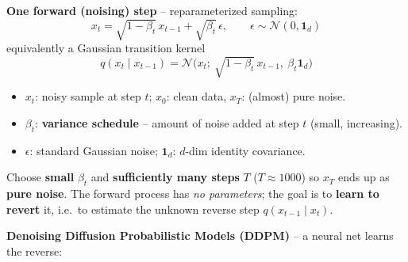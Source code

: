 \documentclass[10pt,a4paper]{article}
\begin{document}
	\begin{formulabox}
		\textbf{One forward (noising) step} -- reparameterized sampling:
		\[
			x_t = \sqrt{1-\beta_t}\,x_{t-1} + \sqrt{\beta_t}\,\epsilon,
			\qquad \epsilon \sim \mathcal{N}(0,\mathbf{1}_d)
		\]
		equivalently a Gaussian transition kernel
		\[
			q(x_t\mid x_{t-1}) = \mathcal{N}\!\big(x_t;\ \sqrt{1-\beta_t}\,x_{t-1},\ \beta_t\mathbf{1}_d\big)
		\]
	\end{formulabox}
	\begin{itemize}[leftmargin=*]
		\item $x_t$: noisy sample at step $t$; \quad $x_0$: clean data, $x_T$: (almost) pure noise.
		\item $\beta_t$: \textbf{variance schedule} -- amount of noise added at step $t$ (small, increasing).
		\item $\epsilon$: standard Gaussian noise; $\mathbf{1}_d$: $d$-dim identity covariance.
	\end{itemize}

	\begin{importantbox}
		Choose \textbf{small} $\beta_t$ and \textbf{sufficiently many steps} $T$ ($T\approx 1000$) so $x_T$ ends up as \textbf{pure noise}. The forward process has \emph{no parameters}; the goal is to \textbf{learn to revert} it, i.e.\ to estimate the unknown reverse step $q(x_{t-1}\mid x_t)$.
	\end{importantbox}

	\textbf{Denoising Diffusion Probabilistic Models (DDPM)} -- a neural net learns the reverse:
\end{document}
